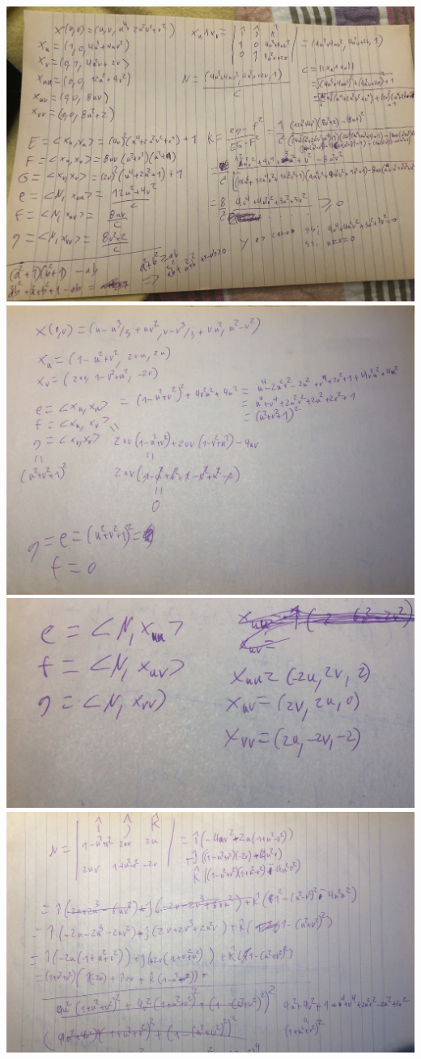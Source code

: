 \includegraphics{img/IMG_5281.jpg}
\includegraphics{img/IMG_5930.jpg}
\includegraphics{img/IMG_5931.jpg}
\includegraphics{img/IMG_5932.jpg}
